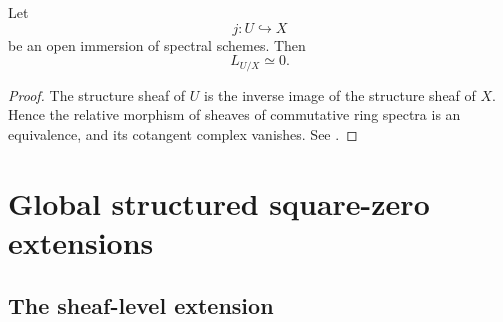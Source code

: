 \begin{corollary}
\label{cor:cotangent-open-immersion}
Let
\[
    j
    \colon
    U
    \hookrightarrow
    X
\]
be an open immersion of spectral schemes. Then
\[
    L_{U/X}
    \simeq
    0.
\]
\end{corollary}

\begin{proof}
The structure sheaf of $U$ is the inverse image of the structure sheaf of
$X$. Hence the relative morphism of sheaves of commutative ring spectra is
an equivalence, and its cotangent complex vanishes. See
\cite[Section~17.1.1]{LurieSAG}.
\end{proof}

\section{Global structured square-zero extensions}
\label{sec:global-structured-square-zero}

\subsection{The sheaf-level extension}

